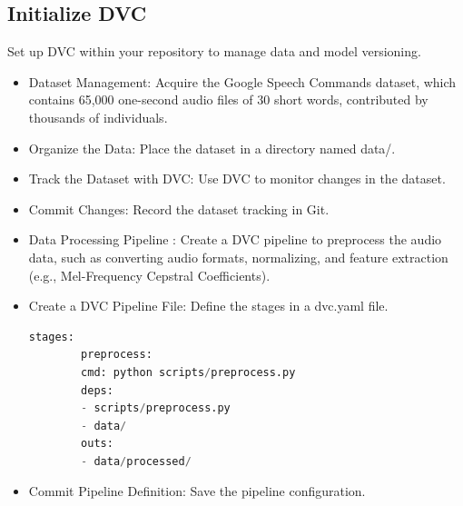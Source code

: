 \medskip
		
\subsection{Initialize DVC}

Set up DVC within your repository to manage data and model versioning.

\medskip



\medskip


\begin{itemize}
	\item Dataset Management: Acquire the Google Speech Commands dataset, which contains 65,000 one-second audio files of 30 short words, contributed by thousands of individuals.
		\item Organize the Data: Place the dataset in a directory named data/.
		
		\item Track the Dataset with DVC: Use DVC to monitor changes in the dataset.
		
		\medskip
		
	
		\item Commit Changes: Record the dataset tracking in Git.
		
		 \medskip
		 
		 
		

        \medskip
		
		\item Data Processing Pipeline : Create a DVC pipeline to preprocess the audio data, such as converting audio formats, normalizing, and feature extraction (e.g., Mel-Frequency Cepstral Coefficients).
		
		\item Create a DVC Pipeline File: Define the stages in a dvc.yaml file.
		
	\begin{lstlisting}[language=python]
		stages:
		preprocess:
		cmd: python scripts/preprocess.py
		deps:
		- scripts/preprocess.py
		- data/
		outs:
		- data/processed/
	\end{lstlisting}
	
	\item Commit Pipeline Definition: Save the pipeline configuration.
			

\end{itemize}
